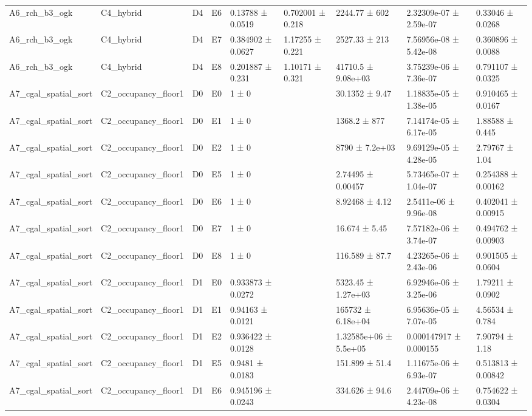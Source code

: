 \begin{table}
\begin{tabular}{lllllllll}
A6\_rch\_b3\_ogk & C4\_hybrid & D4 & E6 & 0.13788 ± 0.0519 & 0.702001 ± 0.218 & 2244.77 ± 602 & 2.32309e-07 ± 2.59e-07 & 0.33046 ± 0.0268 \\
A6\_rch\_b3\_ogk & C4\_hybrid & D4 & E7 & 0.384902 ± 0.0627 & 1.17255 ± 0.221 & 2527.33 ± 213 & 7.56956e-08 ± 5.42e-08 & 0.360896 ± 0.0088 \\
A6\_rch\_b3\_ogk & C4\_hybrid & D4 & E8 & 0.201887 ± 0.231 & 1.10171 ± 0.321 & 41710.5 ± 9.08e+03 & 3.75239e-06 ± 7.36e-07 & 0.791107 ± 0.0325 \\
A7\_cgal\_spatial\_sort & C2\_occupancy\_floor1 & D0 & E0 & 1 ± 0 &  & 30.1352 ± 9.47 & 1.18835e-05 ± 1.38e-05 & 0.910465 ± 0.0167 \\
A7\_cgal\_spatial\_sort & C2\_occupancy\_floor1 & D0 & E1 & 1 ± 0 &  & 1368.2 ± 877 & 7.14174e-05 ± 6.17e-05 & 1.88588 ± 0.445 \\
A7\_cgal\_spatial\_sort & C2\_occupancy\_floor1 & D0 & E2 & 1 ± 0 &  & 8790 ± 7.2e+03 & 9.69129e-05 ± 4.28e-05 & 2.79767 ± 1.04 \\
A7\_cgal\_spatial\_sort & C2\_occupancy\_floor1 & D0 & E5 & 1 ± 0 &  & 2.74495 ± 0.00457 & 5.73465e-07 ± 1.04e-07 & 0.254388 ± 0.00162 \\
A7\_cgal\_spatial\_sort & C2\_occupancy\_floor1 & D0 & E6 & 1 ± 0 &  & 8.92468 ± 4.12 & 2.5411e-06 ± 9.96e-08 & 0.402041 ± 0.00915 \\
A7\_cgal\_spatial\_sort & C2\_occupancy\_floor1 & D0 & E7 & 1 ± 0 &  & 16.674 ± 5.45 & 7.57182e-06 ± 3.74e-07 & 0.494762 ± 0.00903 \\
A7\_cgal\_spatial\_sort & C2\_occupancy\_floor1 & D0 & E8 & 1 ± 0 &  & 116.589 ± 87.7 & 4.23265e-06 ± 2.43e-06 & 0.901505 ± 0.0604 \\
A7\_cgal\_spatial\_sort & C2\_occupancy\_floor1 & D1 & E0 & 0.933873 ± 0.0272 &  & 5323.45 ± 1.27e+03 & 6.92946e-06 ± 3.25e-06 & 1.79211 ± 0.0902 \\
A7\_cgal\_spatial\_sort & C2\_occupancy\_floor1 & D1 & E1 & 0.94163 ± 0.0121 &  & 165732 ± 6.18e+04 & 6.95636e-05 ± 7.07e-05 & 4.56534 ± 0.784 \\
A7\_cgal\_spatial\_sort & C2\_occupancy\_floor1 & D1 & E2 & 0.936422 ± 0.0128 &  & 1.32585e+06 ± 5.5e+05 & 0.000147917 ± 0.000155 & 7.90794 ± 1.18 \\
A7\_cgal\_spatial\_sort & C2\_occupancy\_floor1 & D1 & E5 & 0.9481 ± 0.0183 &  & 151.899 ± 51.4 & 1.11675e-06 ± 6.93e-07 & 0.513813 ± 0.00842 \\
A7\_cgal\_spatial\_sort & C2\_occupancy\_floor1 & D1 & E6 & 0.945196 ± 0.0243 &  & 334.626 ± 94.6 & 2.44709e-06 ± 4.23e-08 & 0.754622 ± 0.0304 \\

\end{tabular}
\end{table}

